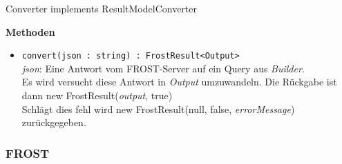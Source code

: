 \begin{Class}{Converter implements ResultModelConverter}

    \textbf{Methoden}
    \begin{itemize}
        \item \texttt{convert(json : string) : FrostResult<Output>}
        \\ \emph{json}: Eine Antwort vom FROST-Server auf ein Query aus \emph{Builder}.
        \\ Es wird versucht diese Antwort in \emph{Output} umzuwandeln.
        Die Rückgabe ist dann new FrostResult(\emph{output}, true)
        \\ Schlägt dies fehl wird new FrostResult(null, false, \emph{errorMessage}) zurückgegeben.
    \end{itemize}
\end{Class}

\subsubsection{FROST}

